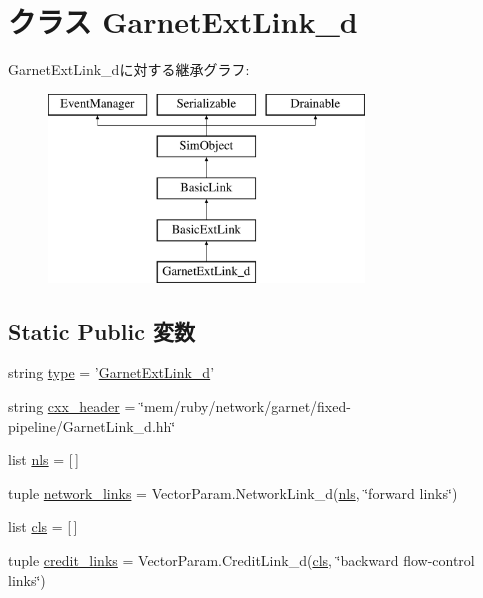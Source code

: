 \hypertarget{classGarnetLink__d_1_1GarnetExtLink__d}{
\section{クラス GarnetExtLink\_\-d}
\label{classGarnetLink__d_1_1GarnetExtLink__d}
}
GarnetExtLink\_\-dに対する継承グラフ:\begin{figure}[H]
\begin{center}
\leavevmode
\includegraphics[height=5cm]{classGarnetLink__d_1_1GarnetExtLink__d}
\end{center}
\end{figure}
\subsection*{Static Public 変数}
\begin{DoxyCompactItemize}
\item 
string \hyperlink{classGarnetLink__d_1_1GarnetExtLink__d_acce15679d830831b0bbe8ebc2a60b2ca}{type} = '\hyperlink{classGarnetLink__d_1_1GarnetExtLink__d}{GarnetExtLink\_\-d}'
\item 
string \hyperlink{classGarnetLink__d_1_1GarnetExtLink__d_a17da7064bc5c518791f0c891eff05fda}{cxx\_\-header} = \char`\"{}mem/ruby/network/garnet/fixed-\/pipeline/GarnetLink\_\-d.hh\char`\"{}
\item 
list \hyperlink{classGarnetLink__d_1_1GarnetExtLink__d_af11789bfc44615f3244deb3cf6054da9}{nls} = \mbox{[}$\,$\mbox{]}
\item 
tuple \hyperlink{classGarnetLink__d_1_1GarnetExtLink__d_a8bbf0848b3bec491562615b151d5c318}{network\_\-links} = VectorParam.NetworkLink\_\-d(\hyperlink{classGarnetLink__d_1_1GarnetExtLink__d_af11789bfc44615f3244deb3cf6054da9}{nls}, \char`\"{}forward links\char`\"{})
\item 
list \hyperlink{classGarnetLink__d_1_1GarnetExtLink__d_ac7f071e45f9ddbded3db29efda614876}{cls} = \mbox{[}$\,$\mbox{]}
\item 
tuple \hyperlink{classGarnetLink__d_1_1GarnetExtLink__d_a1cb258d6b6f19b0fe2d904ca97ebd474}{credit\_\-links} = VectorParam.CreditLink\_\-d(\hyperlink{classGarnetLink__d_1_1GarnetExtLink__d_ac7f071e45f9ddbded3db29efda614876}{cls}, \char`\"{}backward flow-\/control links\char`\"{})
\end{DoxyCompactItemize}


